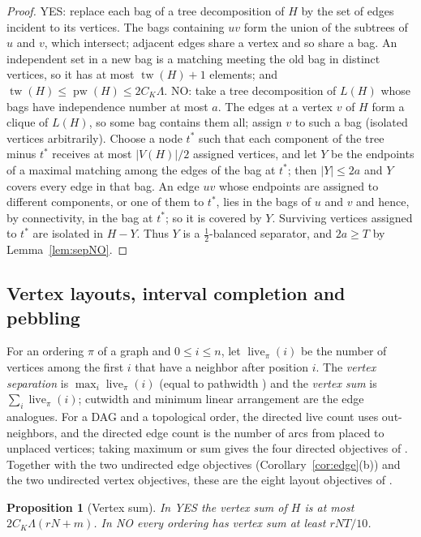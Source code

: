 \documentclass[11pt,letterpaper]{article}
\newtheorem{proposition}[theorem]{Proposition}
\theoremstyle{definition}
\theoremstyle{remark}
\DeclareMathOperator{\tw}{tw}
\DeclareMathOperator{\pw}{pw}
\DeclareMathOperator{\live}{live}
\begin{document}
\begin{proof}
YES: replace each bag of a tree decomposition of \(H\) by the set of edges
incident to its vertices. The bags containing \(uv\) form the union of the
subtrees of \(u\) and \(v\), which intersect; adjacent edges share a vertex
and so share a bag. An independent set in a new bag is a matching meeting
the old bag in distinct vertices, so it has at most \(\tw(H)+1\) elements;
and \(\tw(H)\le\pw(H)\le2C_K\Lambda\). NO: take a tree decomposition of
\(L(H)\) whose bags have independence number at most \(a\). The edges at a
vertex \(v\) of \(H\) form a clique of \(L(H)\), so some bag contains them
all; assign \(v\) to such a bag (isolated vertices arbitrarily). Choose a
node \(t^*\) such that each component of the tree minus \(t^*\) receives at
most \(|V(H)|/2\) assigned vertices, and let \(Y\) be the endpoints of a
maximal matching among the edges of the bag at \(t^*\); then \(|Y|\le2a\) and
\(Y\) covers every edge in that bag. An edge \(uv\) whose endpoints are
assigned to different components, or one of them to \(t^*\), lies in the
bags of \(u\) and \(v\) and hence, by connectivity, in the bag at \(t^*\);
so it is covered by \(Y\). Surviving vertices assigned to \(t^*\) are
isolated in \(H-Y\). Thus \(Y\) is a \(\frac12\)-balanced separator, and
\(2a\ge T\) by Lemma~\ref{lem:sepNO}.
\end{proof}

\subsection{Vertex layouts, interval completion and pebbling}\label{sec:layouts}

For an ordering \(\pi\) of a graph and \(0\le i\le n\), let \(\live_\pi(i)\)
be the number of vertices among the first \(i\) that have a neighbor after
position \(i\). The \emph{vertex separation} is \(\max_i\live_\pi(i)\)
(equal to pathwidth \cite{kin92}) and the \emph{vertex sum} is
\(\sum_i\live_\pi(i)\); cutwidth and minimum linear arrangement are the
edge analogues. For a DAG and a topological order, the directed live count
uses out-neighbors, and the directed edge count is the number of arcs from
placed to unplaced vertices; taking maximum or sum gives the four directed
objectives of \cite{wapl14}. Together with the two undirected edge
objectives (Corollary~\ref{cor:edge}(b)) and the two undirected vertex
objectives, these are the eight layout objectives of \cite{wapl14}.

\begin{proposition}[Vertex sum]\label{prop:vsum}
In YES the vertex sum of \(H\) is at most \(2C_K\Lambda(rN+m)\). In NO every
ordering has vertex sum at least \(rNT/10\).
\end{proposition}
\end{document}
